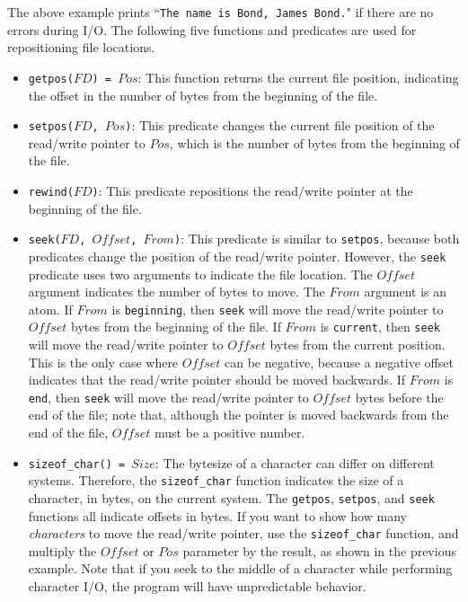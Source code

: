 {The above example prints ``\texttt{The name is Bond, James Bond.}" if there are no errors during I/O.  The following five functions and predicates are used for repositioning file locations.
\begin{itemize}
\item \texttt{getpos($FD$) = $Pos$}: This function returns the current file position, indicating the offset in the number of bytes from the beginning of the file.
\item \texttt{setpos($FD$, $Pos$)}: This predicate changes the current file position of the read/write pointer to $Pos$, which is the number of bytes from the beginning of the file.
\item \texttt{rewind($FD$)}: This predicate repositions the read/write pointer at the beginning of the file.
\item \texttt{seek($FD$, $Offset$, $From$)}: This predicate is similar to \texttt{setpos}, because both predicates change the position of the read/write pointer.  However, the \texttt{seek} predicate uses two arguments to indicate the file location.  The $Offset$ argument indicates the number of bytes to move.  The $From$ argument is an atom.  If $From$ is \texttt{beginning}, then \texttt{seek} will move the read/write pointer to $Offset$ bytes from the beginning of the file.  If $From$ is \texttt{current}, then \texttt{seek} will move the read/write pointer to $Offset$ bytes from the current position.  This is the only case where $Offset$ can be negative, because a negative offset indicates that the read/write pointer should be moved backwards.  If $From$ is \texttt{end}, then \texttt{seek} will move the read/write pointer to $Offset$ bytes before the end of the file; note that, although the pointer is moved backwards from the end of the file, $Offset$ must be a positive number.  
\item \texttt{sizeof\_char() = $Size$}: The bytesize of a character can differ on different systems.  Therefore, the \texttt{sizeof\_char} function indicates the size of a character, in bytes, on the current system.  The \texttt{getpos}, \texttt{setpos}, and \texttt{seek} functions all indicate offsets in bytes.  If you want to show how many \emph{characters} to move the read/write pointer, use the \texttt{sizeof\_char} function, and multiply the $Offset$ or $Pos$ parameter by the result, as shown in the previous example.  Note that if you seek to the middle of a character while performing character I/O, the program will have unpredictable behavior.    

\end{itemize}}
